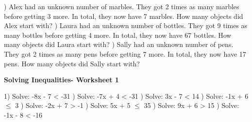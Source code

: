 \documentclass{article}%
\begin{document}
) Alex had an unknown number of marbles. They got 2 times as many marbles before getting 3 more. In total, they now have 7 marbles. How many objects did Alex start with?%
\newline%
\newline%
) Laura had an unknown number of bottles. They got 9 times as many bottles before getting 4 more. In total, they now have 67 bottles. How many objects did Laura start with?%
\newline%
\newline%
) Sally had an unknown number of pens. They got 2 times as many pens before getting 7 more. In total, they now have 17 pens. How many objects did Sally start with?%
\newline%
\newline%
\newline%
\pagebreak%
\large%
\begin{center}%
\textbf{Solving Inequalities- Worksheet 1}%
\newline%
\newline%
\newline%
\end{center} \normalsize%
1) Solve: -8x - 7 < -31%
\newline%
\newline%
) Solve: -7x + 4 < -31%
\newline%
\newline%
) Solve: 3x - 7 < 14%
\newline%
\newline%
) Solve: -1x + 6 $\leq$ 3%
\newline%
\newline%
) Solve: -2x + 7 > -1%
\newline%
\newline%
) Solve: 5x + 5 $\leq$ 35%
\newline%
\newline%
) Solve: 9x + 6 > 15%
\newline%
\newline%
) Solve: -1x - 8 < -16%
\end{document}
